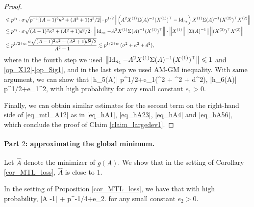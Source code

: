 \begin{proof}
\begin{align}
&\leqslant p^{e_1}\cdot \sigma \sqrt{p^{-1}[(A-1)^2\kappa^2 + (A^2+1)d^2/2]} \cdot p^{1/2} \left\| \left(A^2 X^{(1)}\Sigma(A)^{-1} (X^{(1)})^\top-\operatorname{Id}_{n_1}\right) X^{(1)} \Sigma(A)^{-1} (X^{(2)})^\top X^{(2)} \right\|  \nonumber\\
&\lesssim p^{e_1}\cdot \sigma \sqrt{ (A-1)^2\kappa^2 + (A^2+1)d^2/2} \cdot \left\|  \operatorname{Id}_{n_1}-A^2 X^{(1)}\Sigma(A)^{-1} (X^{(1)})^\top\right\|\cdot  \left\|X^{(1)}\right\| \left\|\Sigma(A)^{-1}\right\|\left\| (X^{(2)})^\top X^{(2)} \right\|  \nonumber\\
&\lesssim p^{1/2+e_1}\frac{\sigma \sqrt{ (A-1)^2\kappa^2 + (A^2+1)d^2/2}}{A^2+1} \lesssim p^{1/2+e_1}(\sigma^2 + \kappa^2 + d^2),\label{eq_hA4}
\end{align}
where in the fourth step we used $\left\|  \operatorname{Id}_{n_1}-A^2 X^{(1)}\Sigma(A)^{-1} (X^{(1)})^\top\right\|\leqslant 1$ and \eqref{op_X12}-\eqref{op_Sig1}, and in the last step we used AM-GM inequality. With same argument, we can show that 
\be\label{eq_hA56} \left|h_5(A)\right| \le p^{1/2+e_1}(\sigma^2 + \kappa^2 + d^2), \quad \left|h_6(A)\right| \le p^{1/2+e_1}\sigma^2,\ee
with high probability for any small constant $e_1>0$. %

Finally, we can obtain similar estimates for the second term on the right-hand side of \eqref{eq_mtl_A12} as in  \eqref{eq_hA1}, \eqref{eq_hA23}, \eqref{eq_hA4} and \eqref{eq_hA56}, which conclude the proof of Claim \ref{claim_largedev1}.
 \end{proof}


\paragraph{Part $2$: approximating the global minimum.}
	Let $\hat{A}$ denote the minimizer of $g(A)$.
	We show that in the setting of Corollary \ref{cor_MTL_loss}, $\hat A$ is close to 1.%

\begin{claim}\label{lem_hat_v}
 In the setting of Proposition \ref{cor_MTL_loss}, we have that with high probability,
	\be\label{hatw_add1}|\hat A -1|\le  {} + p^{-1/4+e_2}. 
	\ee
	for any small constant $e_2>0$.
\end{claim}

